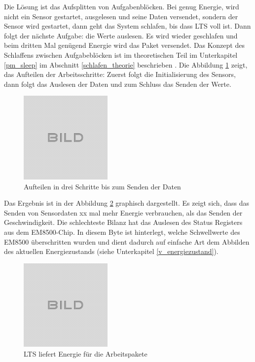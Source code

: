 Die Lösung ist das Aufsplitten von Aufgabenblöcken. Bei genug Energie, wird nicht ein Sensor gestartet, ausgelesen und seine Daten versendet, sondern der Sensor wird gestartet, dann geht das System schlafen, bis dass LTS voll ist. Dann folgt der nächste Aufgabe: die Werte auslesen. Es wird wieder geschlafen und beim dritten Mal genügend Energie wird das Paket versendet. Das Konzept des Schlaffens zwischen Aufgabeblöcken ist im theoretischen Teil im Unterkapitel \ref{pm_sleep} im Abschnitt \ref{schlafen_theorie} beschrieben . Die Abbildung \ref{arbeitsaufteilung} zeigt, das Aufteilen der Arbeitsschritte: Zuerst folgt die Initialisierung des Sensors, dann folgt das Auslesen der Daten und zum Schluss das Senden der Werte.

\begin{figure}[ht]
    \includegraphics[width=0.4\textwidth]{idle.png}
    \caption{Aufteilen in drei Schritte bis zum Senden der Daten}
    \label{arbeitsaufteilung}
\end{figure}


Das Ergebnis ist in der Abbildung \ref{Sensor_Energie} graphisch dargestellt. Es zeigt sich, dass das Senden von Sensordaten  xx mal mehr Energie verbrauchen, als das Senden der Geschwindigkeit. Die schlechteste Bilanz hat das Auslesen des Status Registers aus dem EM8500-Chip. In diesem Byte ist hinterlegt, welche Schwellwerte des EM8500 überschritten wurden und dient dadurch auf einfache Art dem Abbilden des aktuellen Energiezustands (siehe Unterkapitel \ref{v_energiezustand}). 

\begin{figure}[ht]
    \includegraphics[width=0.4\textwidth]{idle.png}
    \caption{LTS liefert Energie für die Arbeitspakete}
    \label{Sensor_Energie}
\end{figure}


